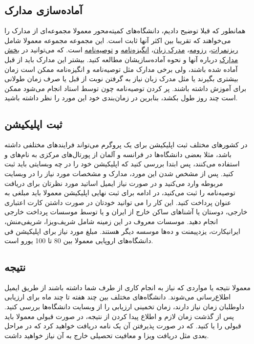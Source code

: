\subsection{آماده‌سازی مدارک}
همانطور که قبلا توضیح دادیم، دانشگاه‌های کمیته‌محور معمولا مجموعه‌ای از مدارک را می‌خواهند که تقریبا بین اکثر آنها ثابت است. این مجموعه
مجموعه معمولا شامل \hyperref[ssec:transcripts]{ریزنمرات}، \hyperref[ssec:cv]{رزومه}، \hyperref[ssec:lang-cert]{مدرک زبان}، \hyperref[ssec:sop]{انگیزه‌نامه} و \hyperref[ssec:recom]{توصیه‌نامه} است. که می‌توانید در \hyperref[sec:admission-docs]{بخش مدارک} درباره آنها و نحوه آماده‌سازیشان مطالعه کنید. 
بیشتر این مدارک باید از قبل آماده شده باشند، ولی برخی مدارک مثل توصیه‌نامه و انگیزه‌نامه ممکن است زمان بیشتری بگیرند یا مثل مدرک زبان نیاز به گرفتن نوبت از قبل یا صرف زمان طولانی برای آموزش داشته باشند. پر کردن توصیه‌نامه 
چون توسط استاد انجام می‌شود ممکن است چند روز طول بکشد، بنابرین در زمان‌بندی خود این مورد را نظر داشته باشید. 

\subsection{ثبت اپلیکیشن}
در کشور‌های مختلف ثبت اپلیکیشن برای یک پروگرم می‌تواند فرایند‌های مختلفی داشته باشد، مثلا بعضی دانشگاه‌ها در فرانسه و آلمان 
از پورتال‌های مرکزی به نام‌های  و  استفاده می‌کنند، پس ابتدا بررسی کنید که اپلیکیشن خود را در چه وبسایتی 
باید ثبت کنید. 
پس از مشخص شدن این مورد، مدارک و مشخصات مورد نیاز را در وبسایت مربوطه وارد می‌کنید و در صورت نیاز ایمیل اساتید مورد نظرتان برای دریافت 
توصیه‌نامه را ثبت می‌کنید، در ادامه برای ثبت نهایی اپلیکیشن  معمولا باید مبلغی به عنوان  پرداخت کنید. 
این کار را می توانید خودتان در صورت داشتن کارت اعتباری خارجی، دوستان یا آشناهای ساکن خارج از ایران و یا توسط موسسات پرداخت خارجی
انجام دهید. موسسات معروف در این زمینه شامل شریف‌ویزا، شریفی‌منش، ایرانیکارت، یزد‌پیمنت و ده‌ها موسسه دیگر هستند. مبلغ مورد نیاز 
برای اپلیکیشن فی دانشگاه‌های اروپایی معمولا بین 80 تا 100 یورو است. 


\subsection{نتیجه}
معمولا نتیجه یا مواردی که نیاز به انجام کاری از طرف شما داشته باشند از طریق ایمیل اطلاع‌رسانی می‌شوند. دانشگاه‌های مختلف 
بین چند هفته تا چند ماه برای ارزیابی داوطلبان زمان نیاز دارند، زمان تخمینی ارزیابی را از وبسایت دانشگاه‌ها بررسی کنید. 
پس از گذشت زمان لازم و اطلاع پیدا کردن از نتیجه، در صورت قبولی معمولا باید قبولی را  یا  کنید. که 
در صورت پذیرفتن آن یک نامه  دریافت خواهید کرد که در مراحل بعدی مثل دریافت ویزا و معافیت تحصیلی خارج به آن 
نیاز خواهید داشت. 


